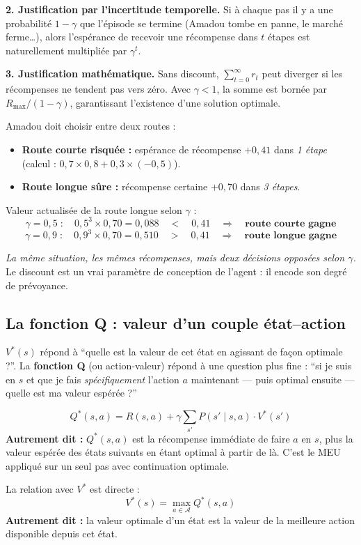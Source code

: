 \documentclass[11pt,a4paper]{article}
\begin{document}
\textbf{2. Justification par l'incertitude temporelle.} Si à chaque pas il y a une probabilité $1-\gamma$ que l'épisode se termine (Amadou tombe en panne, le marché ferme\ldots), alors l'espérance de recevoir une récompense dans $t$ étapes est naturellement multipliée par $\gamma^t$.

\textbf{3. Justification mathématique.} Sans discount, $\sum_{t=0}^\infty r_t$ peut diverger si les récompenses ne tendent pas vers zéro. Avec $\gamma < 1$, la somme est bornée par $R_{\max}/(1-\gamma)$, garantissant l'existence d'une solution optimale.

\begin{exemplebox}
Amadou doit choisir entre deux routes :
\begin{itemize}[nosep]
    \item \textbf{Route courte risquée :} espérance de récompense $+0{,}41$ dans \textit{1 étape} (calcul : $0{,}7 \times 0{,}8 + 0{,}3 \times (-0{,}5)$).
    \item \textbf{Route longue sûre :} récompense certaine $+0{,}70$ dans \textit{3 étapes}.
\end{itemize}

Valeur actualisée de la route longue selon $\gamma$ :
$$\gamma = 0{,}5 \; : \quad 0{,}5^3 \times 0{,}70 = 0{,}088 \quad < \quad 0{,}41 \quad \Rightarrow \quad \textbf{route courte gagne}$$
$$\gamma = 0{,}9 \; : \quad 0{,}9^3 \times 0{,}70 = 0{,}510 \quad > \quad 0{,}41 \quad \Rightarrow \quad \textbf{route longue gagne}$$

\textit{La même situation, les mêmes récompenses, mais deux décisions opposées selon $\gamma$.} Le discount est un vrai paramètre de conception de l'agent : il encode son degré de prévoyance.
\end{exemplebox}

\subsection{La fonction Q : valeur d'un couple état--action}

$V^*(s)$ répond à ``quelle est la valeur de cet état en agissant de façon optimale ?''. La \textbf{fonction Q} (ou action-valeur) répond à une question plus fine : ``si je suis en $s$ et que je fais \textit{spécifiquement} l'action $a$ maintenant --- puis optimal ensuite --- quelle est ma valeur espérée ?''

\begin{definitionbox}[Fonction Q]
$$Q^*(s, a) = R(s, a) + \gamma \sum_{s'} P(s' \mid s, a) \cdot V^*(s')$$
\textbf{Autrement dit :} $Q^*(s,a)$ est la récompense immédiate de faire $a$ en $s$, plus la valeur espérée des états suivants en étant optimal à partir de là. C'est le MEU appliqué sur un seul pas avec continuation optimale.

La relation avec $V^*$ est directe :
$$V^*(s) = \max_{a \in \mathcal{A}} Q^*(s, a)$$
\textbf{Autrement dit :} la valeur optimale d'un état est la valeur de la meilleure action disponible depuis cet état.
\end{definitionbox}
\end{document}
